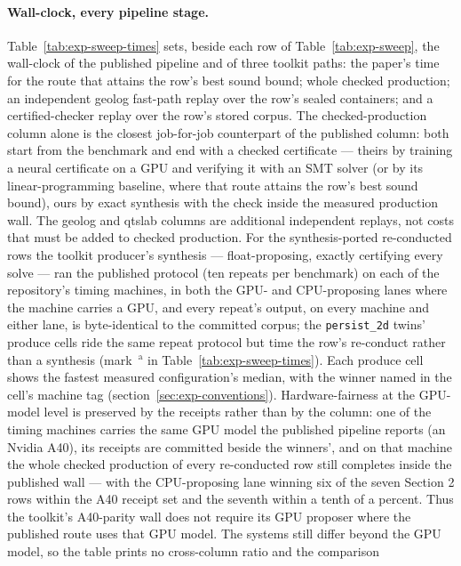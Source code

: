 \paragraph{Wall-clock, every pipeline stage.}
Table~\ref{tab:exp-sweep-times} sets, beside each row of
Table~\ref{tab:exp-sweep}, the wall-clock of the published pipeline
and of three toolkit paths: the paper's time for the route that attains
the row's best sound bound; whole checked production; an independent
geolog fast-path replay over the row's sealed containers; and a
certified-checker replay over the row's stored corpus. The checked-production
column alone is the closest job-for-job counterpart of the published column:
both start from the benchmark and end with a checked certificate --- theirs
by training a neural certificate on a GPU and verifying it with an SMT solver
(or by its linear-programming baseline, where that route attains the row's
best sound bound), ours by exact synthesis with the check inside the measured
production wall. The geolog and qtslab columns are additional independent
replays, not costs that must be added to checked production. For the
synthesis-ported re-conducted rows the toolkit producer's synthesis ---
float-proposing, exactly certifying every solve --- ran the published
protocol (ten repeats per benchmark) on each of the repository's timing
machines, in both the GPU- and CPU-proposing lanes where the machine carries
a GPU, and every repeat's output, on every machine and either lane, is
byte-identical to the committed corpus; the \texttt{persist\_2d} twins'
produce cells ride the same repeat protocol but time the row's re-conduct
rather than a synthesis (mark~$^{\text{a}}$ in
Table~\ref{tab:exp-sweep-times}). Each produce cell shows the fastest measured
configuration's median, with the winner named in the cell's machine
tag (section~\ref{sec:exp-conventions}). Hardware-fairness at the
GPU-model level is preserved by the receipts rather than by the
column: one of the timing machines carries the same GPU model the
published pipeline reports (an Nvidia A40), its receipts are
committed beside the winners', and on that machine the whole checked
production of every re-conducted row still completes inside the
published wall --- with the CPU-proposing lane winning six of the seven
Section 2 rows within the A40 receipt set and the seventh within a tenth of a
percent. Thus the toolkit's A40-parity wall does not require its GPU proposer
where the published route uses that GPU model. The systems still differ
beyond the GPU model, so the table prints no cross-column ratio and the comparison
